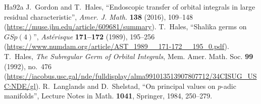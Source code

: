 \documentclass[11pt,letterpaper]{article}
\begin{document}
\begin{thebibliography}{Ha92a}
 J.~Gordon and T.~Hales, ``Endoscopic transfer of orbital integrals in large residual characteristic'', \textit{Amer. J. Math.} \textbf{138} (2016), 109--148 (\url{https://muse.jhu.edu/article/609681/summary}).
 T.~Hales, ``Shalika germs on $GSp(4)$'', \textit{Ast\'erisque} \textbf{171--172} (1989), 195--256 (\url{https://www.numdam.org/article/AST_1989__171-172__195_0.pdf}).
 T.~Hales, \textit{The Subregular Germ of Orbital Integrals}, Mem. Amer. Math. Soc. \textbf{99} (1992), no.~476 (\url{https://iacobus.usc.gal/nde/fulldisplay/alma991013513907807712/34CISUG_USC:NDE/gl}).
 R.~Langlands and D.~Shelstad, ``On principal values on $p$-adic manifolds'', Lecture Notes in Math. \textbf{1041}, Springer, 1984, 250--279.
\end{thebibliography}
\end{document}
